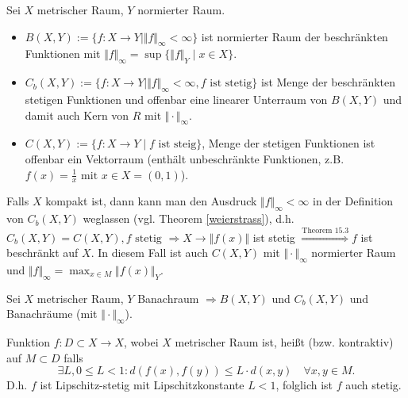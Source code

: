 \begin{overview}
    Sei $X$ metrischer Raum, $Y$ normierter Raum.
    \begin{itemize}
    \item $B(X,Y):=\{f:X\to Y\mid \Vert f\Vert_{\infty} < \infty\}$ ist normierter Raum der beschränkten Funktionen mit $\Vert f\Vert_{\infty}=\sup\{\Vert f \Vert_{Y} \mid x \in X\}$.
    \item $C_b(X,Y):=\{f:X\to Y\mid \Vert f \Vert_{\infty} < \infty, f \text{ ist stetig}\}$ ist Menge der beschränkten stetigen Funktionen und offenbar eine linearer Unterraum von $B(X,Y)$ und damit auch Kern von $R \text{ mit } \Vert \cdot \Vert_{\infty}$.
    \item $C(X,Y):= \{f: X\to Y\mid f \text{ ist steig}\}$, Menge der stetigen Funktionen ist offenbar ein Vektorraum (enthält unbeschränkte Funktionen, z.B. $f(x)=\frac{1}{x} \text{ mit } x \in X = (0,1)$).
    \end{itemize}
\end{overview}

\begin{remark}
	Falls $X$ kompakt ist, dann kann man den Ausdruck $\Vert f \Vert_{\infty} < \infty$ in der Definition von $C_b(X,Y)$ weglassen (vgl. Theorem \ref{weierstrass}), d.h. $C_b(X,Y) = C(X,Y),f \text{ stetig }\Rightarrow X \to \Vert f(x)\Vert$ ist stetig $\overset{\text{Theorem 15.3}}{\Rightarrow} f$ ist beschränkt auf $X$. In diesem Fall ist auch $C(X,Y)$ mit $\Vert \cdot \Vert_{\infty}$ normierter Raum und $\Vert f\Vert_{\infty} = \max_{x\in M}\Vert f(x)\Vert_{Y}$.
\end{remark}

\begin{proposition}
    Sei $X$ metrischer Raum, $Y$ Banachraum $\Rightarrow B(X,Y)$ und $C_b(X,Y)$ und Banachräume (mit $\Vert \cdot \Vert_{\infty}$).
\end{proposition}

\begin{definition}
    Funktion $f: D \subset X \to X$, wobei $X$ metrischer Raum ist, heißt  (bzw. kontraktiv) auf $M \subset D$ falls
    \[
    \exists L, 0 \leq L < 1\colon d(f(x),f(y)) \leq L\cdot d(x,y) \quad \forall x,y \in M.
    \]
    D.h. $f$ ist Lipschitz-stetig mit Lipschitzkonstante $L < 1$, folglich ist $f$ auch stetig.
\end{definition}

